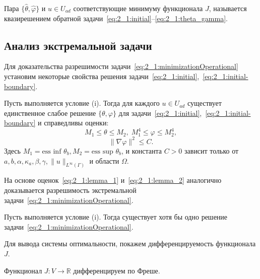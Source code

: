 Пара $\{\hat{\theta}, \hat{\varphi} \}$ и $u \in U_{ad}$ соответствующие минимуму функционала $J$,
называется квазирешением обратной задачи~\eqref{eq:2_1:initial}--\eqref{eq:2_1:theta_gamma}.

\subsection{Анализ экстремальной задачи}\label{subsec:ch2/sec1/subsec3}

Для доказательства разрешимости задачи~\eqref{eq:2_1:minimizationOperational}
установим некоторые свойства решения
задачи~\eqref{eq:2_1:initial},~\eqref{eq:2_1:initial-boundary}.

\begin{lemma}
    Пусть выполняется условие (i).
    Тогда для каждого $ u \in U_{ad} $ существует единственное слабое решение
    $\{\theta, \varphi \}$ для задачи~\eqref{eq:2_1:initial},~\eqref{eq:2_1:initial-boundary}
    и справедливы оценки:
    \begin{equation}
        \label{eq:2_1:lemma_1}
        M_1 \le \theta \le M_2, \; M_1^4 \le \varphi \le M_2^4,
    \end{equation}
    \begin{equation}
        \label{eq:2_1:lemma_2}
        \| \nabla \varphi \|^2 \le C.
    \end{equation}
    Здесь $M_1 = \text{ess inf } \theta_b, M_2 = \text{ess sup } \theta_b$,
    и константа $C > 0$ зависит только от
    $a, b, \alpha, \kappa_a, \beta, \gamma, \|u\|_{L^\infty(\Gamma)}$ и области $\Omega$.
\end{lemma}

На основе оценок~\eqref{eq:2_1:lemma_1} и~\eqref{eq:2_1:lemma_2}
аналогично~\cite{Kovtanyuk2014TheoreticalAnalysis}
доказывается разрешимость экстремальной
задачи~\eqref{eq:2_1:minimizationOperational}.


\begin{theorem}
    \label{th:2_1:1}
    Пусть выполняется условие (i).
    Тогда существует хотя бы одно решение задачи~\eqref{eq:2_1:minimizationOperational}.
\end{theorem}

Для вывода системы оптимальности, покажем дифференцируемость функционала $J$.
\begin{lemma}
    \label{lm:2_1:freshet_diff}
    Функционал $J : V \rightarrow \mathbb{R}$ дифференцируем по Фреше.
\end{lemma}

